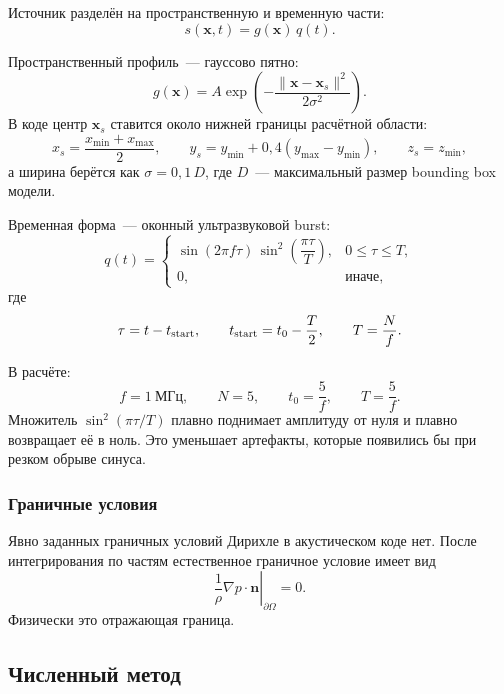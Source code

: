 Источник разделён на пространственную и временную части:
\begin{equation}
  s(\mathbf{x},t)=g(\mathbf{x})\,q(t).
\end{equation}

Пространственный профиль~--- гауссово пятно:
\begin{equation}
  g(\mathbf{x}) =
  A \exp\left(
    -\frac{\|\mathbf{x}-\mathbf{x}_s\|^2}{2\sigma^2}
  \right).
\end{equation}
В коде центр $\mathbf{x}_s$ ставится около нижней границы расчётной
области:
\begin{equation}
  x_s=\frac{x_{\min}+x_{\max}}{2}, \qquad
  y_s=y_{\min}+0{,}4(y_{\max}-y_{\min}), \qquad
  z_s=z_{\min},
\end{equation}
а ширина берётся как $\sigma=0{,}1\,D$, где $D$~--- максимальный размер
bounding box модели.

Временная форма~--- оконный ультразвуковой burst:
\begin{equation}\label{eq:burst}
q(t)=
\begin{cases}
  \sin(2\pi f\tau)\,
  \sin^2\left(\dfrac{\pi\tau}{T}\right),
  & 0 \le \tau \le T,\\[8pt]
  0, & \text{иначе},
\end{cases}
\end{equation}
где
\[
  \tau=t-t_{\rm start}, \qquad
  t_{\rm start}=t_0-\frac{T}{2}, \qquad
  T=\frac{N}{f}.
\]

В расчёте:
\[
  f = 1~\text{МГц}, \qquad N=5, \qquad
  t_0=\frac{5}{f}, \qquad T=\frac{5}{f}.
\]
Множитель $\sin^2(\pi\tau/T)$ плавно поднимает амплитуду от нуля и плавно возвращает её в ноль.
Это уменьшает артефакты, которые появились бы при резком обрыве синуса.

\subsubsection{Граничные условия}

Явно заданных граничных условий Дирихле в акустическом коде нет.
После интегрирования по частям естественное граничное условие имеет вид
\begin{equation}
  \left.
  \frac{1}{\rho}\nabla p\cdot\mathbf{n}
  \right|_{\partial\Omega}=0.
\end{equation}
Физически это отражающая граница.

\subsection{Численный метод}

